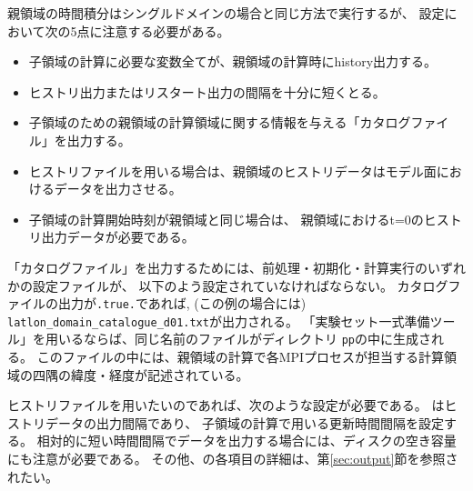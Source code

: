 親領域の時間積分はシングルドメインの場合と同じ方法で実行するが、
設定において次の5点に注意する必要がある。

\begin{itemize}
 \item 子領域の計算に必要な変数全てが、親領域の計算時にhistory出力する。
 \item ヒストリ出力またはリスタート出力の間隔を十分に短くとる。
 \item 子領域のための親領域の計算領域に関する情報を与える「カタログファイル」を出力する。
 \item ヒストリファイルを用いる場合は、親領域のヒストリデータはモデル面におけるデータを出力させる。
 \item 子領域の計算開始時刻が親領域と同じ場合は、 親領域におけるt=0のヒストリ出力データが必要である。
\end{itemize}

「カタログファイル」を出力するためには、前処理・初期化・計算実行のいずれかの設定ファイルが、
以下のよう設定されていなければならない。
カタログファイルの出力が\verb|.true.|であれば, (この例の場合には)
\verb|latlon_domain_catalogue_d01.txt|が出力される。
「実験セット一式準備ツール」を用いるならば、同じ名前のファイルがディレクトリ \verb|pp|の中に生成される。
このファイルの中には、親領域の計算で各MPIプロセスが担当する計算領域の四隅の緯度・経度が記述されている。

ヒストリファイルを用いたいのであれば、次のような設定が必要である。
はヒストリデータの出力間隔であり、
子領域の計算で用いる更新時間間隔を設定する。
相対的に短い時間間隔でデータを出力する場合には、ディスクの空き容量にも注意が必要である。
その他、の各項目の詳細は、第\ref{sec:output}節を参照されたい。

